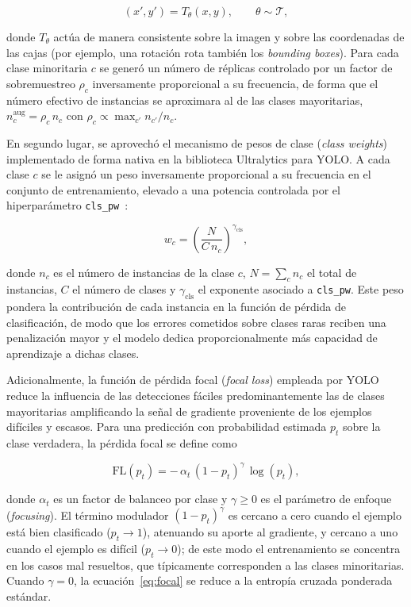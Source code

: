 \begin{equation}
  (x', y') = T_\theta(x, y), \qquad \theta \sim \mathcal{T},
  \label{eq:augment}
\end{equation}

donde $T_\theta$ actúa de manera consistente sobre la imagen y sobre las coordenadas de las
cajas (por ejemplo, una rotación rota también los \textit{bounding boxes}). Para cada clase
minoritaria $c$ se generó un número de réplicas controlado por un factor de sobremuestreo
$\rho_c$ inversamente proporcional a su frecuencia, de forma que el número efectivo de
instancias se aproximara al de las clases mayoritarias,
$n_c^{\text{aug}} = \rho_c\, n_c$ con $\rho_c \propto \max_{c'} n_{c'} / n_c$.

En segundo lugar, se aprovechó el mecanismo de pesos de clase (\textit{class weights})
implementado de forma nativa en la biblioteca Ultralytics para YOLO. A cada clase $c$ se le
asignó un peso inversamente proporcional a su frecuencia en el conjunto de entrenamiento,
elevado a una potencia controlada por el hiperparámetro \texttt{cls\_pw}~\cite{guo2025review}:

\begin{equation}
  w_c = \left( \frac{N}{C\, n_c} \right)^{\gamma_{\text{cls}}},
  \label{eq:classweights}
\end{equation}

donde $n_c$ es el número de instancias de la clase $c$, $N = \sum_{c} n_c$ el total de
instancias, $C$ el número de clases y $\gamma_{\text{cls}}$ el exponente asociado a
\texttt{cls\_pw}. Este peso pondera la contribución de cada instancia en la función de
pérdida de clasificación, de modo que los errores cometidos sobre clases raras reciben una
penalización mayor y el modelo dedica proporcionalmente más capacidad de aprendizaje a
dichas clases.

Adicionalmente, la función de pérdida focal (\textit{focal loss}) empleada por
YOLO~\cite{waltonEtAl2023} reduce la influencia de las detecciones fáciles
predominantemente las de clases mayoritarias amplificando la señal de gradiente
proveniente de los ejemplos difíciles y escasos. Para una predicción con probabilidad
estimada $p_t$ sobre la clase verdadera, la pérdida focal se define como

\begin{equation}
  \mathrm{FL}(p_t) = -\,\alpha_t \,(1 - p_t)^{\gamma}\, \log(p_t),
  \label{eq:focal}
\end{equation}

donde $\alpha_t$ es un factor de balanceo por clase y $\gamma \ge 0$ es el parámetro de
enfoque (\textit{focusing}). El término modulador $(1 - p_t)^{\gamma}$ es cercano a cero
cuando el ejemplo está bien clasificado ($p_t \to 1$), atenuando su aporte al gradiente, y
cercano a uno cuando el ejemplo es difícil ($p_t \to 0$); de este modo el entrenamiento se
concentra en los casos mal resueltos, que típicamente corresponden a las clases
minoritarias. Cuando $\gamma = 0$, la ecuación~\eqref{eq:focal} se reduce a la entropía
cruzada ponderada estándar.
 
